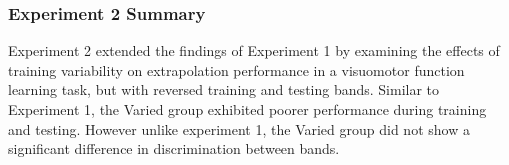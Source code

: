 \documentclass[
  12pt,
  letterpaper,
]{article}
\begin{document}
\begin{table}

\caption{\label{tbl-e2-bmm-vx}}


\end{table}%

\subsubsection{Experiment 2 Summary}\label{experiment-2-summary}

Experiment 2 extended the findings of Experiment 1 by examining the
effects of training variability on extrapolation performance in a
visuomotor function learning task, but with reversed training and
testing bands. Similar to Experiment 1, the Varied group exhibited
poorer performance during training and testing. However unlike
experiment 1, the Varied group did not show a significant difference in
discrimination between bands.
\end{document}

